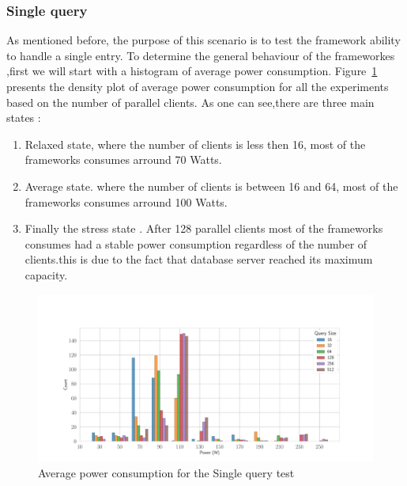 \subsubsection{Single query}
As mentioned before, the purpose of this scenario is to test the framework ability to handle a single entry.
To determine the general behaviour of the frameworkes ,first we will start with a histogram of average power consumption. Figure~\ref{fig:av_power_db} presents the  density plot of average power consumption  for all the experiments based on the number of parallel clients. As one can see,there are three main states :
\begin{enumerate}
    \item Relaxed state, where the number of clients is less then 16, most of the frameworks consumes arround 70 Watts.
    \item Average state. where the number of clients is between 16 and 64, most of the frameworks consumes arround 100 Watts.
    \item Finally the stress state . After 128 parallel clients most of the frameworks consumes had a stable power consumption regardless of the number of clients.this is due to the fact that database server reached its maximum capacity. %
\end{enumerate}
\begin{figure}[hbt]
    \centering
    \includegraphics[width=
        \columnwidth]{imgs/histogram_av_power_cpu_db}
    \caption{Average power consumption for the Single query test }
    \label{fig:av_power_db}
\end{figure}

